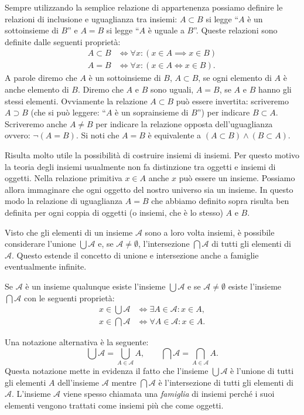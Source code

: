 Sempre utilizzando la semplice relazione di appartenenza possiamo definire
le relazioni di inclusione e uguaglianza tra insiemi:
$A \subset B$ si legge ``$A$ è un sottoinsieme di $B$''
e $A=B$ si legge ``$A$ è uguale a $B$''. Queste relazioni sono
definite dalle seguenti proprietà:
\begin{align*}
  A \subset B &\iff \forall x\colon (x\in A \implies x\in B)\\
  A = B &\iff \forall x\colon (x\in A \iff x \in B).
\end{align*}
A parole diremo che $A$ è un sottoinsieme di $B$, 
$A \subset B$, se ogni elemento di $A$ è anche elemento di $B$.
Diremo che $A$ e $B$ sono uguali, $A=B$, 
se $A$ e $B$ hanno gli stessi elementi.
Ovviamente la relazione $A \subset B$ può essere invertita: scriveremo
$A\supset B$ (che si può leggere: ``$A$ è un soprainsieme di $B$'')
per indicare $B \subset A$. Scriveremo anche $A \neq B$ per indicare
la relazione opposta dell'uguaglianza ovvero: $\lnot(A=B)$.
Si noti che $A=B$ è equivalente a $(A\subset B) \land (B\subset A)$.

Risulta molto utile la possibilità di costruire insiemi di insiemi.
Per questo motivo la teoria degli insiemi usualmente non fa distinzione
tra oggetti e insiemi di oggetti. Nella relazione primitiva $x\in A$ anche
$x$ può essere un insieme. Possiamo allora immaginare che ogni oggetto del
nostro universo sia un insieme. In questo modo la relazione di uguaglianza $A=B$
che abbiamo definito sopra risulta ben definita per ogni coppia di oggetti
(o insiemi, che è lo stesso) $A$ e $B$.

Visto che gli elementi di un insieme $\mathcal A$ sono a loro volta insiemi,
è possibile considerare l'unione $\bigcup \mathcal A$
e, se
$\mathcal A \neq \emptyset$, l'intersezione $\bigcap \mathcal A$ di tutti gli elementi
di $\mathcal A$.
Questo estende il concetto di unione e intersezione anche a famiglie
eventualmente infinite.

\begin{axiom}
Se $\mathcal A$ è un insieme qualunque esiste l'insieme $\bigcup \mathcal A$
e se $\mathcal A \neq \emptyset$ esiste l'insieme $\bigcap \mathcal A$
con le seguenti proprietà:
\begin{align*}
  x \in \bigcup \mathcal A & \iff \exists A \in \mathcal A \colon x\in A, \\
  x \in \bigcap \mathcal A & \iff \forall A \in \mathcal A \colon x\in A.
\end{align*}
\end{axiom}
Una notazione alternativa è la seguente:
\[
 \bigcup \mathcal A = \bigcup_{A\in \mathcal A} A, \qquad 
 \bigcap \mathcal A = \bigcap_{A\in \mathcal A} A.  
\]
Questa notazione mette in evidenza il fatto che l'insieme 
$\bigcup \mathcal A$ è l'unione di tutti gli elementi $A$ dell'insieme 
$\mathcal A$ mentre $\bigcap \mathcal A$ è l'intersezione 
di tutti gli elementi di $\mathcal A$.
L'insieme $\mathcal A$ viene spesso chiamata una \emph{famiglia}
di insiemi perché i suoi elementi vengono trattati come insiemi 
più che come oggetti.


